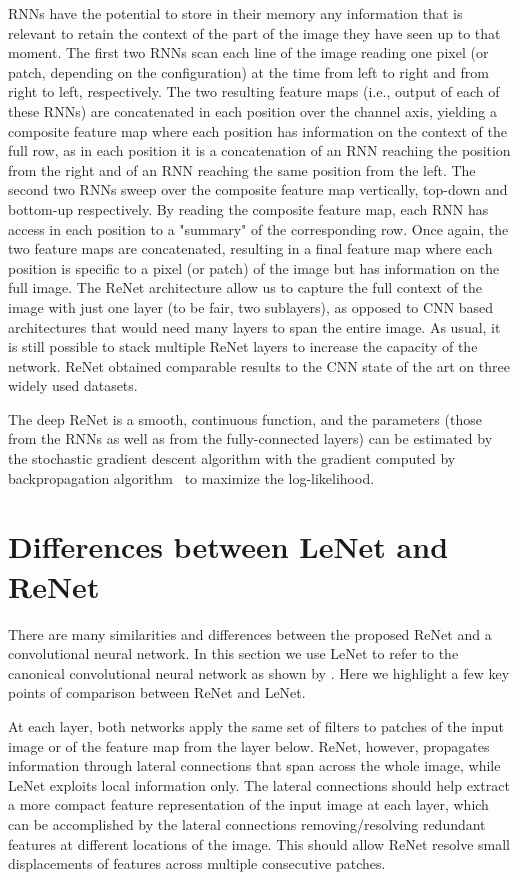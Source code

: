 RNNs have the potential to store in their memory any information that is
relevant to retain the context of the part of the image they have seen up to
that moment. The first two RNNs scan each line of the image reading one pixel
(or patch, depending on the configuration) at the time from left to right and
from right to left, respectively. The two resulting feature maps (i.e., output
of each of these RNNs) are concatenated in each position over the channel axis,
yielding a composite feature map where each position has information on the
context of the full row, as in each position it is a concatenation of an RNN
reaching the position from the right and of an RNN reaching the same position
from the left. The second two RNNs sweep over the composite feature map
vertically, top-down and bottom-up respectively. By reading the composite
feature map, each RNN has access in each position to a "summary" of the
corresponding row. Once again, the two feature maps are concatenated, resulting
in a final feature map where each position is specific to a pixel (or patch) of
the image but has information on the full image. The ReNet architecture allow
us to capture the full context of the image with just one layer (to be fair,
two sublayers), as opposed to CNN based architectures that would need many
layers to span the entire image. As usual, it is still possible to stack
multiple ReNet layers to increase the capacity of the network. ReNet obtained
comparable results to the CNN state of the art on three widely used datasets.

The deep ReNet is a smooth, continuous function, and the parameters (those from
the RNNs as well as from the fully-connected layers) can be estimated by the
stochastic gradient descent algorithm with the gradient computed by
backpropagation algorithm~\citep[see, e.g.,][]{BP86} to maximize the
log-likelihood.

\section{Differences between LeNet and ReNet}
\label{sec:lenetrenet}

There are many similarities and differences between the proposed ReNet and a
convolutional neural network. In this section we use LeNet to refer to the
canonical convolutional neural network as shown by \citet{LeCun89}. Here we
highlight a few key points of comparison between ReNet and LeNet.

At each layer, both networks apply the same set of filters to patches of the
input image or of the feature map from the layer below. ReNet, however,
propagates information through lateral connections that span across the whole
image, while LeNet exploits local information only. The lateral connections
should help extract a more compact feature representation of the input image at
each layer, which can be accomplished by the lateral connections
removing/resolving redundant features at different locations of the image. This
should allow ReNet resolve small displacements of features across multiple
consecutive patches.


